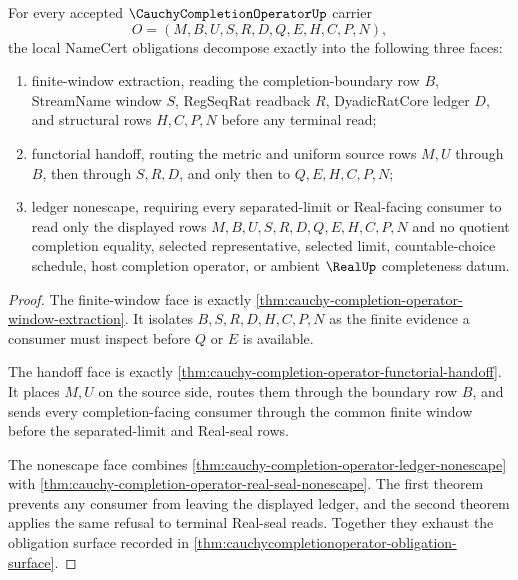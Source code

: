 \begin{theorem}
\label{thm:cauchy-completion-operator-obligation-triad}
For every accepted $\CauchyCompletionOperatorUp$ carrier
$$
O=(M,B,U,S,R,D,Q,E,H,C,P,N),
$$
the local NameCert obligations decompose exactly into the following three faces:
\begin{enumerate}
\item finite-window extraction, reading the completion-boundary row $B$, StreamName window $S$, RegSeqRat readback $R$, DyadicRatCore ledger $D$, and structural rows $H,C,P,N$ before any terminal read;
\item functorial handoff, routing the metric and uniform source rows $M,U$ through $B$, then through $S,R,D$, and only then to $Q,E,H,C,P,N$;
\item ledger nonescape, requiring every separated-limit or Real-facing consumer to read only the displayed rows $M,B,U,S,R,D,Q,E,H,C,P,N$ and no quotient completion equality, selected representative, selected limit, countable-choice schedule, host completion operator, or ambient $\RealUp$ completeness datum.
\end{enumerate}
\end{theorem}
\begin{proof}
The finite-window face is exactly \autoref{thm:cauchy-completion-operator-window-extraction}. It isolates $B,S,R,D,H,C,P,N$ as the finite evidence a consumer must inspect before $Q$ or $E$ is available.

The handoff face is exactly \autoref{thm:cauchy-completion-operator-functorial-handoff}. It places $M,U$ on the source side, routes them through the boundary row $B$, and sends every completion-facing consumer through the common finite window before the separated-limit and Real-seal rows.

The nonescape face combines \autoref{thm:cauchy-completion-operator-ledger-nonescape} with \autoref{thm:cauchy-completion-operator-real-seal-nonescape}. The first theorem prevents any consumer from leaving the displayed ledger, and the second theorem applies the same refusal to terminal Real-seal reads. Together they exhaust the obligation surface recorded in \autoref{thm:cauchycompletionoperator-obligation-surface}.
\end{proof}

